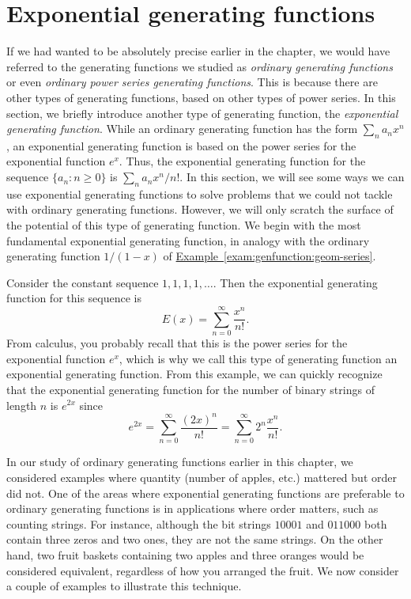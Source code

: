 \section{Exponential generating functions}

If we had wanted to be absolutely precise earlier in the chapter, we
would have referred to the generating functions we studied as
\emph{ordinary generating functions} or even \emph{ordinary power
  series generating functions}. This is because there are other types
of generating functions, based on other types of power series. In this
section, we briefly introduce another type of generating function, the
\emph{exponential generating function}. While an ordinary generating
function has the form $\sum_{n} a_n x^n$, an exponential generating
function is based on the power series for the exponential function
$e^x$. Thus, the exponential generating function for the sequence
$\{a_n\colon n\geq 0\}$ is $\sum_n a_n x^n/n!$. In this section, we
will see some ways we can use exponential generating functions to
solve problems that we could not tackle with ordinary generating
functions. However, we will only scratch the surface of the potential
of this type of generating function. We begin with the most
fundamental exponential generating function, in analogy with the
ordinary generating function $1/(1-x)$ of
\hyperref[exam:genfunction:geom-series]{Example~\ref*{exam:genfunction:geom-series}}.

\begin{example}
  Consider the constant sequence $1, 1, 1, 1, \dots$. Then the
  exponential generating function for this sequence is 
  \[E(x) = \sum_{n=0}^\infty \frac{x^n}{n!}.\]
  From calculus, you probably recall that this is the power series for
  the exponential function $e^x$, which is why we call this type of
  generating function an exponential generating function. From this
  example, we can quickly recognize that the exponential generating
  function for the number of binary strings of length $n$ is $e^{2x}$
  since
  \[e^{2x} = \sum_{n=0}^\infty \frac{(2x)^n}{n!} = \sum_{n=0}^\infty
  2^n\frac{x^n}{n!}.\]
\end{example}

In our study of ordinary generating functions earlier in this chapter,
we considered examples where quantity (number of apples, etc.)
mattered but order did not. One of the areas where exponential
generating functions are preferable to ordinary generating functions
is in applications where order matters, such as counting
strings. For instance, although the bit strings $10001$ and $011000$
both contain three zeros and two ones, they are not the same
strings. On the other hand, two fruit baskets containing two apples
and three oranges would be considered equivalent, regardless of how
you arranged the fruit. We now consider a couple of examples to
illustrate this technique.

